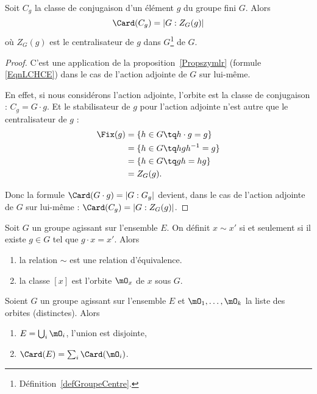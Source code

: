 \begin{corollary}       \label{CORooRRVHooTyCjZZ}
	Soit \( C_g\) la classe de conjugaison d'un élément  \( g\) du groupe fini \( G\). Alors
	\begin{equation}
		\Card(C_g)=| G:Z_G(g) |
	\end{equation}
	où $Z_G(g)$ est le centralisateur de \( g\) dans \( G\)\footnote{Définition~\ref{defGroupeCentre}.} de \( G\).
\end{corollary}

\begin{proof}
	C'est une application de la proposition~\ref{Propszymlr} (formule \eqref{EqnLCHCE}) dans le cas de l'action adjointe de \( G\) sur lui-même.

	En effet, si nous considérons l'action adjointe, l'orbite est la classe de conjugaison : \( C_g=G\cdot g\). Et le stabilisateur de \( g\) pour l'action adjointe n'est autre que le centralisateur de \( g\) :
	\begin{subequations}
		\begin{align}
			\Fix(g) & =\{ h\in G\tq h\cdot g=g \}  \\
			        & =\{ h\in G\tq hgh^{-1}=g \}  \\
			        & =\{ h\in G\tq gh=hg \}       \\
			        & =Z_G(g).
		\end{align}
	\end{subequations}

	Donc la formule \( \Card(G\cdot g)=| G:G_g |\) devient, dans le cas de l'action adjointe de \( G\) sur lui-même : \( \Card(C_g)=| G:Z_G(g) |\).
\end{proof}

\begin{lemma}
	Soit \( G\) un groupe agissant sur l'ensemble \( E\). On définit \( x\sim x'\) si et seulement si il existe \( g\in G\) tel que \( g\cdot x=x'\). Alors
	\begin{enumerate}
		\item
		      la relation \( \sim\) est une relation d'équivalence.
		\item
		      la classe \( [x]\) est l'orbite \( \mO_x\) de \( x\) sous \( G\).
	\end{enumerate}
\end{lemma}

\begin{corollary} \label{CorARFVMP}
	Soient \( G\) un groupe agissant sur l'ensemble \( E\) et \( \mO_1,\ldots, \mO_k  \) la liste des orbites (distinctes). Alors
	\begin{enumerate}
		\item
		      \( E=\bigcup_i\mO_i\), l'union est disjointe,
		\item
		      \( \Card(E)=\sum_i\Card(\mO_i)\).
	\end{enumerate}
\end{corollary}

